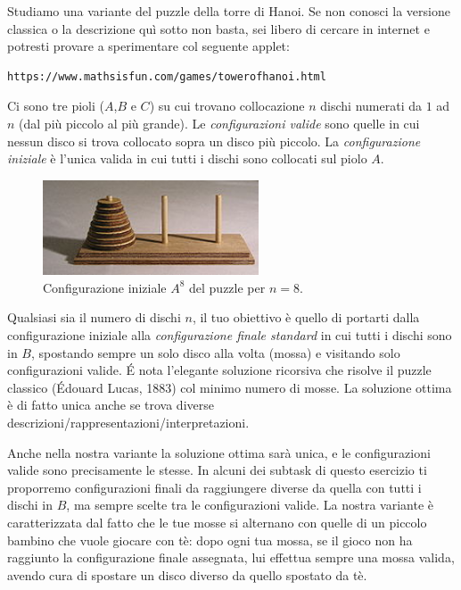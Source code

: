 \renewcommand{\nomebreve}{hanoi\_with\_toddler}
\renewcommand{\titolo}{Playing the Hanoi puzzle with a toddler\\}

\introduzione{}

Studiamo una variante del puzzle della torre di Hanoi. Se non conosci la versione classica o la descrizione quì sotto non basta, sei libero di cercare in internet e potresti provare a sperimentare col seguente applet:

\begin{verbatim}
https://www.mathsisfun.com/games/towerofhanoi.html
\end{verbatim}

Ci sono tre pioli ($A$,$B$ e $C$) su cui trovano collocazione $n$ dischi numerati da $1$ ad $n$ (dal più piccolo al più grande). Le \emph{configurazioni valide} sono quelle in cui nessun disco si trova collocato sopra un disco più piccolo.
La \emph{configurazione iniziale} è l'unica valida in cui tutti i dischi sono collocati sul piolo $A$.

\begin{figure}[h!]
\begin{center}
  \noindent \includegraphics[width=0.57\textwidth]{figures/220px-Tower_of_Hanoi.jpeg}
\end{center}
\caption{Configurazione iniziale $A^8$ del puzzle per $n=8$.}
\end{figure}

Qualsiasi sia il numero di dischi $n$, il tuo obiettivo è quello di portarti dalla configurazione iniziale alla \emph{configurazione finale standard} in cui tutti i dischi sono in $B$, spostando sempre un solo disco alla volta (mossa) e visitando solo configurazioni valide.
\'E nota l'elegante soluzione ricorsiva che risolve il puzzle classico (Édouard Lucas, 1883) col minimo numero di mosse. La soluzione ottima è di fatto unica anche se trova diverse descrizioni/rappresentazioni/interpretazioni.

Anche nella nostra variante la soluzione ottima sarà unica, e le configurazioni valide sono precisamente le stesse. In alcuni dei subtask di questo esercizio ti proporremo configurazioni finali da raggiungere diverse da quella con tutti i dischi in $B$, ma sempre scelte tra le configurazioni valide. La nostra variante è caratterizzata dal fatto che le tue mosse si alternano con quelle di un piccolo bambino che vuole giocare con tè: dopo ogni tua mossa, se il gioco non ha raggiunto la configurazione finale assegnata, lui effettua sempre una mossa valida, avendo cura di spostare un disco diverso da quello spostato da tè.\\

